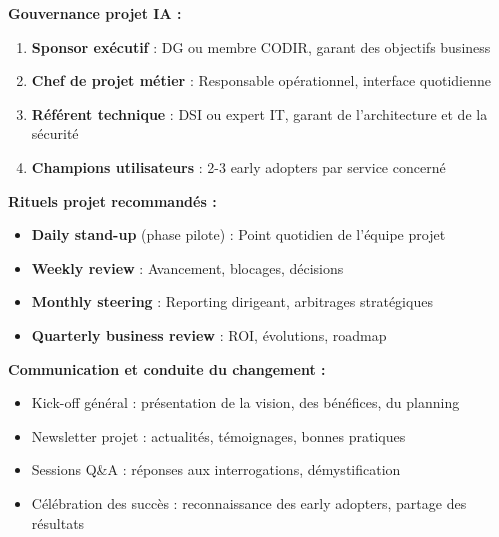 \textbf{Gouvernance projet IA :}
\begin{enumerate}
    \item \textbf{Sponsor exécutif} : DG ou membre CODIR, garant des objectifs business
    \item \textbf{Chef de projet métier} : Responsable opérationnel, interface quotidienne
    \item \textbf{Référent technique} : DSI ou expert IT, garant de l'architecture et de la sécurité
    \item \textbf{Champions utilisateurs} : 2-3 early adopters par service concerné
\end{enumerate}

\textbf{Rituels projet recommandés :}
\begin{itemize}
    \item \textbf{Daily stand-up} (phase pilote) : Point quotidien de l'équipe projet
    \item \textbf{Weekly review} : Avancement, blocages, décisions
    \item \textbf{Monthly steering} : Reporting dirigeant, arbitrages stratégiques
    \item \textbf{Quarterly business review} : ROI, évolutions, roadmap
\end{itemize}

\textbf{Communication et conduite du changement :}
\begin{itemize}
    \item Kick-off général : présentation de la vision, des bénéfices, du planning
    \item Newsletter projet : actualités, témoignages, bonnes pratiques
    \item Sessions Q\&A : réponses aux interrogations, démystification
    \item Célébration des succès : reconnaissance des early adopters, partage des résultats
\end{itemize}
